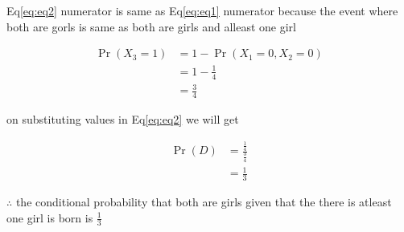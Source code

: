 \documentclass[journal,12pt,twocolumn]{IEEEtran}
\providecommand{\pr}[1]{\ensuremath{\Pr\left(#1\right)}}
\begin{document}
\begin{enumerate}
        Eq\eqref{eq:eq2} numerator is same as Eq\eqref{eq:eq1} numerator because the event where both are gorls is same as both are girls and alleast one girl
        
        \begin{align}
           \pr{X_{3} = 1 } &= 1 - \pr{ X_{1}=0 , X_{2} = 0 } \\
                           &= 1 - \frac{1}{4} \\
                           &= \frac{3}{4}
        \end{align}
        
        on substituting values in Eq\eqref{eq:eq2} we will get 
        
        \begin{align}
            \pr{D} &= \frac{ \frac{1}{4} }{ \frac{3}{4} } \\
                   &= \frac{1}{3}
        \end{align}
        
        $\therefore$ the conditional probability that both are girls given that the there is atleast one girl is born is $\frac{1}{3}$
        
        
        
    \end{enumerate}
\end{document}
